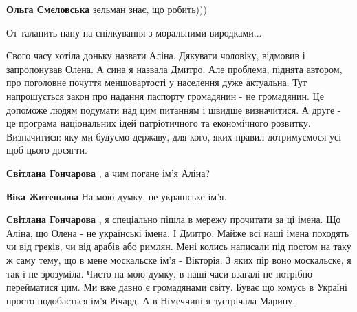 \begin{itemize}
\begin{itemize}
\textbf{Ольга Смєловська} зельман знає, що робить)))
\end{itemize}

 
От таланить пану на спілкування з моральними виродками...

 

Свого часу хотіла доньку назвати Аліна. Дякувати чоловіку, відмовив і
запропонував Олена. А сина я назвала Дмитро. Але проблема, піднята автором, про
поголовне почуття меншовартості у населення дуже актуальна. Тут напрошується
закон про надання паспорту громадянин - не громадянин. Це допоможе людям
подумати над цим питанням і швидше визначитися. А друге - це програма
національних ідей патріотичного та економічного розвитку. Визначитися: яку ми
будуємо державу, для кого, яких правил дотримуємося усі щоб цього досягти.

\begin{itemize}
 
\textbf{Світлана Гончарова} , а чим погане ім'я Аліна?

 
\textbf{Віка Житеньова} На мою думку, не українське ім'я.

 
\textbf{Світлана Гончарова} , я спеціально пішла в мережу прочитати за ці
імена. Що Аліна, що Олена - не українські імена. І Дмитро. Майже всі наші імена
походять чи від греків, чи від арабів або римлян. Мені колись написали під
постом на таку ж саму тему, що в мене москальске ім'я - Вікторія. З яких пір
воно москальске, я так і не зрозуміла. Чисто на мою думку, в наші часи взагалі
не потрібно перейматися цим. Ми вже давно є громадянами світу. Буває що комусь
в Україні просто подобається ім'я Річард. А в Німеччині я зустрічала Марину.


\end{itemize}
\end{itemize}
